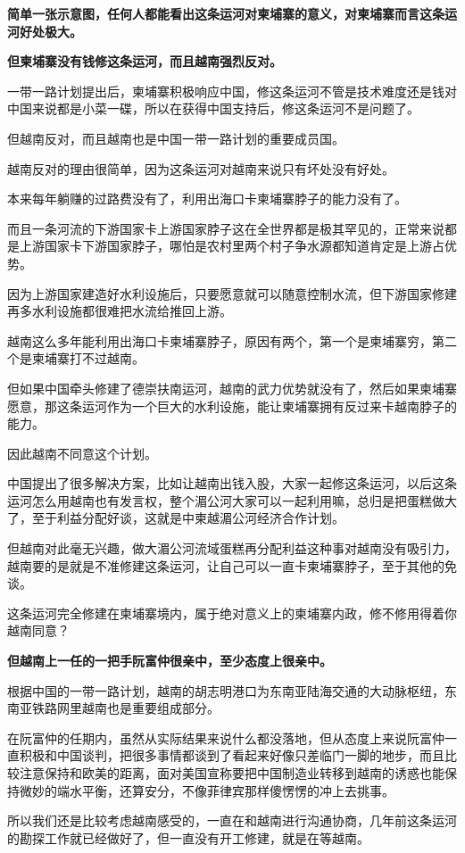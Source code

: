 \documentclass[UTF8, 11pt, oneside]{ctexart}
\newcommand{\zd}[1]{\textbf{\textcolor[RGB]{123,12,0}{#1}}} %
\begin{document}
\zd{简单一张示意图，任何人都能看出这条运河对柬埔寨的意义，对柬埔寨而言这条运河好处极大。}

\zd{但柬埔寨没有钱修这条运河，而且越南强烈反对。}

一带一路计划提出后，柬埔寨积极响应中国，修这条运河不管是技术难度还是钱对中国来说都是小菜一碟，所以在获得中国支持后，修这条运河不是问题了。

但越南反对，而且越南也是中国一带一路计划的重要成员国。

越南反对的理由很简单，因为这条运河对越南来说只有坏处没有好处。

本来每年躺赚的过路费没有了，利用出海口卡柬埔寨脖子的能力没有了。

而且一条河流的下游国家卡上游国家脖子这在全世界都是极其罕见的，正常来说都是上游国家卡下游国家脖子，哪怕是农村里两个村子争水源都知道肯定是上游占优势。

因为上游国家建造好水利设施后，只要愿意就可以随意控制水流，但下游国家修建再多水利设施都很难把水流给推回上游。

越南这么多年能利用出海口卡柬埔寨脖子，原因有两个，第一个是柬埔寨穷，第二个是柬埔寨打不过越南。

但如果中国牵头修建了德崇扶南运河，越南的武力优势就没有了，然后如果柬埔寨愿意，那这条运河作为一个巨大的水利设施，能让柬埔寨拥有反过来卡越南脖子的能力。

因此越南不同意这个计划。

中国提出了很多解决方案，比如让越南出钱入股，大家一起修这条运河，以后这条运河怎么用越南也有发言权，整个湄公河大家可以一起利用嘛，总归是把蛋糕做大了，至于利益分配好谈，这就是中柬越湄公河经济合作计划。

但越南对此毫无兴趣，做大湄公河流域蛋糕再分配利益这种事对越南没有吸引力，越南要的是就是不准修建这条运河，让自己可以一直卡柬埔寨脖子，至于其他的免谈。

这条运河完全修建在柬埔寨境内，属于绝对意义上的柬埔寨内政，修不修用得着你越南同意？

\zd{但越南上一任的一把手阮富仲很亲中，至少态度上很亲中。}

根据中国的一带一路计划，越南的胡志明港口为东南亚陆海交通的大动脉枢纽，东南亚铁路网里越南也是重要组成部分。

在阮富仲的任期内，虽然从实际结果来说什么都没落地，但从态度上来说阮富仲一直积极和中国谈判，把很多事情都谈到了看起来好像只差临门一脚的地步，而且比较注意保持和欧美的距离，面对美国宣称要把中国制造业转移到越南的诱惑也能保持微妙的端水平衡，还算安分，不像菲律宾那样傻愣愣的冲上去挑事。

所以我们还是比较考虑越南感受的，一直在和越南进行沟通协商，几年前这条运河的勘探工作就已经做好了，但一直没有开工修建，就是在等越南。
\end{document}
